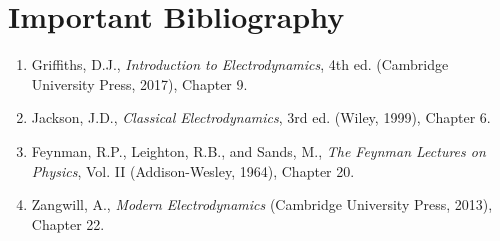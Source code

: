 \section*{Important Bibliography}

\begin{enumerate}
\item Griffiths, D.J., \textit{Introduction to Electrodynamics}, 4th ed. (Cambridge University Press, 2017), Chapter 9.
\item Jackson, J.D., \textit{Classical Electrodynamics}, 3rd ed. (Wiley, 1999), Chapter 6.
\item Feynman, R.P., Leighton, R.B., and Sands, M., \textit{The Feynman Lectures on Physics}, Vol. II (Addison-Wesley, 1964), Chapter 20.
\item Zangwill, A., \textit{Modern Electrodynamics} (Cambridge University Press, 2013), Chapter 22.
\end{enumerate}

